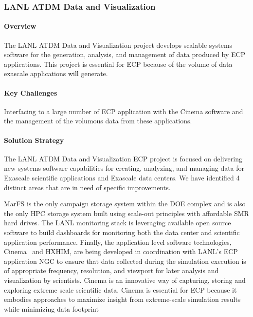 \subsubsection{ LANL ATDM Data and Visualization} 

\paragraph{Overview} 
The LANL ATDM Data and Visualization project develops scalable
systems software for the generation, analysis, and management of data
produced by ECP applications. This project is essential for ECP because
of the volume of data exascale applications will generate.

\paragraph{Key Challenges}
Interfacing to a large number of ECP application with the Cinema software and the management of the volumous data from these applications.

\paragraph{Solution Strategy}
The LANL ATDM Data and Visualization ECP project is focused on delivering new
systems software capabilities for creating, analyzing, and managing data for
Exascale scientific applications and Exascale data centers. We have identified
4 distinct areas that are in need of specific improvements.

MarFS is the only campaign storage system within the DOE complex and is
also the only HPC storage system built using scale-out principles with affordable
SMR hard drives. The LANL monitoring stack is leveraging available open source
software to build dashboards for monitoring both the data center and
scientific application performance. Finally, the application level software
technologies, Cinema~\cite{cinema:Ahrens:SC14} and HXHIM, are being developed in coordination with
LANL's ECP application NGC to ensure that data collected during the simulation
execution is of appropriate frequency, resolution, and viewport for later
analysis and visualization by scientists. Cinema is an innovative way of
capturing, storing and exploring extreme scale scientific data. Cinema is
essential for ECP because it embodies approaches to maximize insight from
extreme-scale simulation results while minimizing data footprint 

